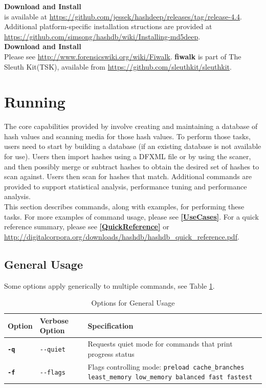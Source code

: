 \documentclass[11pt,fleqn]{article} %
\begin{document}
\textbf{Download and Install \mdd}\\
\mdd is available at
\url{https://github.com/jessek/hashdeep/releases/tag/release-4.4}.
Additional platform-specific installation structions are provided at
\url{https://github.com/simsong/hashdb/wiki/Installing-md5deep}.\\

\textbf{Download and Install \fiwalk}\\
Please see \url{http://www.forensicswiki.org/wiki/Fiwalk}.
\textbf{fiwalk} is part of The Sleuth Kit\textregistered\xspace (TSK),
available from \url{https://github.com/sleuthkit/sleuthkit}. \\

\section {Running \hash}
\label{Running}
The core capabilities provided by \hash involve creating and maintaining a database of hash values and scanning media for those hash values. To perform those tasks, \hash users need to start by building a database (if an existing database is not available for use).
Users then import hashes using a DFXML file or by using the \bulk \hash scaner, and then possibly merge or subtract hashes to obtain the desired set of hashes to scan against.
Users then scan for hashes that match.
Additional commands are provided to support statistical analysis, performance tuning and performance analysis.\\

This section describes \hash commands, along with examples, for performing these tasks.
For more examples of command usage, please see \textbf{\autoref{UseCases}}.
For a \hash quick reference summary, please see \textbf{\autoref{QuickReference}}
or \url{http://digitalcorpora.org/downloads/hashdb/hashdb_quick_reference.pdf}.

\subsection{General Usage}
Some options apply generically to multiple commands,
see Table \ref{tab:general}.\\

\begin{table}[!ht]
\centering
\caption{Options for General Usage}
\label{tab:general}
\begin{tabular}{|p{1.5 cm}|p{8 cm}|p{4 cm}|}
\hline \hline
\textbf{Option} & \textbf{Verbose Option} & \textbf{Specification} \\
\hline
\textbf{\texttt{-q}} & \verb+--quiet+ & Requests quiet mode for commands that print progress status\\
\hline
\textbf{\texttt{-f}} & \verb+--flags+ & Flags controlling mode: \texttt{preload cache\_branches least\_memory low\_memory balanced fast fastest}\\
\hline
\end{tabular}
\end{table}
\end{document}

